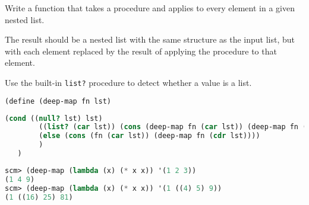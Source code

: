 \question Write a function that takes a procedure and applies to every
element in a given nested list.

The result should be a nested list with the same structure as the input list,
but with each element replaced by the result of applying the procedure to that
element.

Use the built-in \texttt{list?} procedure to detect whether a value is a list.
\begin{lstlisting}[language=Scheme]
(define (deep-map fn lst)
\end{lstlisting}
\begin{solution}[1in]
\begin{lstlisting}[language=Scheme]
  (cond ((null? lst) lst)
        ((list? (car lst)) (cons (deep-map fn (car lst)) (deep-map fn (cdr lst))))
        (else (cons (fn (car lst)) (deep-map fn (cdr lst))))
        )
   )
\end{lstlisting}
\end{solution}
\begin{lstlisting}[language=Scheme]
scm> (deep-map (lambda (x) (* x x)) '(1 2 3))
(1 4 9)
scm> (deep-map (lambda (x) (* x x)) '(1 ((4) 5) 9))
(1 ((16) 25) 81)
\end{lstlisting}
